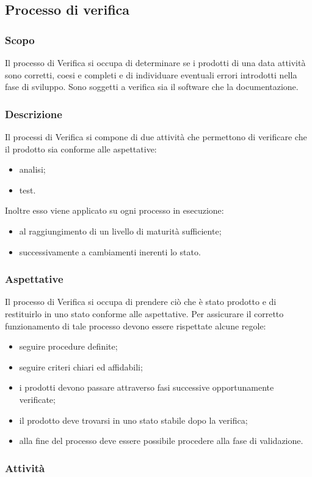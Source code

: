 \subsection{Processo di verifica}
\subsubsection{Scopo}
Il processo di Verifica si occupa di determinare se i prodotti di una data attività sono corretti, coesi e completi e di individuare eventuali errori introdotti nella fase di sviluppo. Sono soggetti a verifica sia il software che la documentazione.
\subsubsection{Descrizione}
Il processi di Verifica si compone di due attività che permettono di verificare che il prodotto sia conforme alle aspettative:
\begin{itemize}
	\item analisi;
	\item test.
\end{itemize}
Inoltre esso viene applicato su ogni processo in esecuzione:
\begin{itemize}
	\item al raggiungimento di un livello di maturità sufficiente;
	\item successivamente a cambiamenti inerenti lo stato.
\end{itemize}
\subsubsection{Aspettative}
Il processo di Verifica si occupa di prendere ciò che è stato prodotto e di restituirlo in uno stato conforme alle aspettative. Per assicurare il corretto funzionamento di tale processo devono essere rispettate alcune regole:
\begin{itemize}
	\item seguire procedure definite;
	\item seguire criteri chiari ed affidabili;
	\item i prodotti devono passare attraverso fasi successive opportunamente verificate;
	\item il prodotto deve trovarsi in uno stato stabile dopo la verifica;
	\item alla fine del processo deve essere possibile procedere alla fase di validazione.
\end{itemize}
\subsubsection{Attività}
